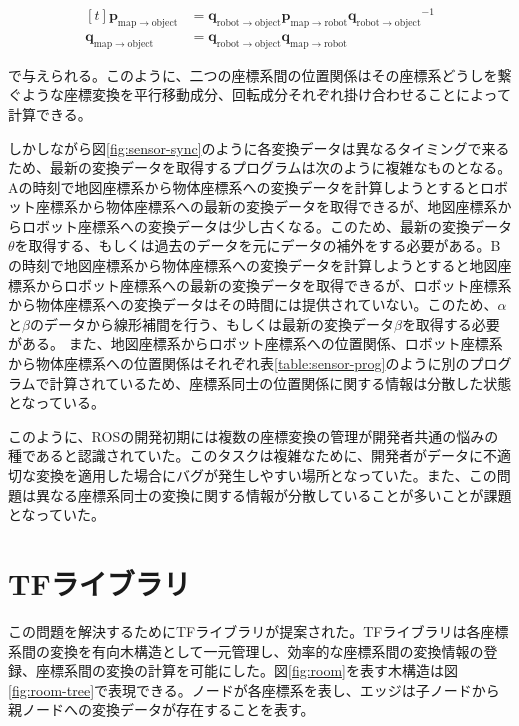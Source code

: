 \documentclass[a4paper]{jreport}	%
\begin{document}
\begin{equation}
\begin{aligned}[t]
	\mathbf{p}_{\mathrm{map \rightarrow object}} &= 
	\mathbf{q}_{\mathrm{robot \rightarrow object}}
	\mathbf{p}_{\mathrm{map \rightarrow robot}}
	{\mathbf{q}_{\mathrm{robot \rightarrow object}}}^{-1} \\
	\mathbf{q}_{\mathrm{map \rightarrow object}} &= \mathbf{q}_{\mathrm{robot \rightarrow object}} 
	\mathbf{q}_{\mathrm{map \rightarrow  robot}}
\end{aligned}
\end{equation}

で与えられる。このように、二つの座標系間の位置関係はその座標系どうしを繋ぐような座標変換を平行移動成分、回転成分それぞれ掛け合わせることによって計算できる。

しかしながら図\ref{fig:sensor-sync}のように各変換データは異なるタイミングで来るため、最新の変換データを取得するプログラムは次のように複雑なものとなる。Aの時刻で地図座標系から物体座標系への変換データを計算しようとするとロボット座標系から物体座標系への最新の変換データを取得できるが、地図座標系からロボット座標系への変換データは少し古くなる。このため、最新の変換データ$\theta$を取得する、もしくは過去のデータを元にデータの補外をする必要がある。Bの時刻で地図座標系から物体座標系への変換データを計算しようとすると地図座標系からロボット座標系への最新の変換データを取得できるが、ロボット座標系から物体座標系への変換データはその時間には提供されていない。このため、$\alpha$と$\beta$のデータから線形補間を行う、もしくは最新の変換データ$\beta$を取得する必要がある。
また、地図座標系からロボット座標系への位置関係、ロボット座標系から物体座標系への位置関係はそれぞれ表\ref{table:sensor-prog}のように別のプログラムで計算されているため、座標系同士の位置関係に関する情報は分散した状態となっている。

このように、ROSの開発初期には複数の座標変換の管理が開発者共通の悩みの種であると認識されていた。このタスクは複雑なために、開発者がデータに不適切な変換を適用した場合にバグが発生しやすい場所となっていた。また、この問題は異なる座標系同士の変換に関する情報が分散していることが多いことが課題となっていた\cite{tf}。

\section{TFライブラリ}
\label{section:intro-tf}

この問題を解決するためにTFライブラリが提案された。TFライブラリは各座標系間の変換を有向木構造として一元管理し、効率的な座標系間の変換情報の登録、座標系間の変換の計算を可能にした\cite{tf}。図\ref{fig:room}を表す木構造は図\ref{fig:room-tree}で表現できる。ノードが各座標系を表し、エッジは子ノードから親ノードへの変換データが存在することを表す。
\end{document}
